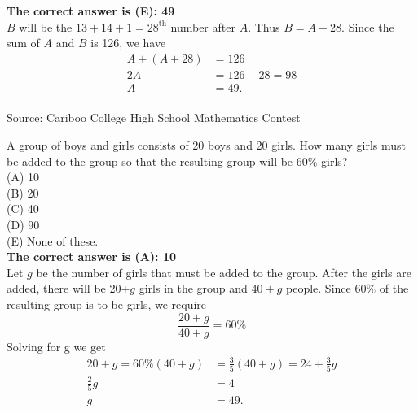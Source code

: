 \documentclass{article}
\begin{document}

\textbf{The correct answer is (E): 49}\\
$B$ will be the $13+14+1=28^{\textrm{th}}$ number after $A$. Thus $B=A+28$. Since the sum of $A$ and $B$ is 126, we have
\begin{align*}
A+(A+28)&=126\\
2A&=126-28=98\\
A&=49.
\end{align*}
\\[5 ex]

\scriptsize
Source: Cariboo College High School Mathematics Contest

\normalsize
A group of boys and girls consists of 20 boys and 20 girls. How many girls must be added to the group so that the resulting group will be $60\%$ girls?\\
(A) 10\\
(B) 20\\
(C) 40\\
(D) 90\\
(E) None of these.\\

\textbf{The correct answer is (A): 10}\\
Let $g$ be the number of girls that must be added to the group. After the girls are added, there will be 20+$g$ girls in the group and $40+g$ people. Since $60\%$ of the resulting group is to be girls, we require
\begin{equation*}
\frac{20+g}{40+g}=60\%
\end{equation*}
Solving for g we get
\begin{align*}
20+g=60\%(40+g)&=\frac{3}{5}(40+g)=24+\frac{3}{5}g\\
\frac{2}{5}g&=4\\
g&=49.
\end{align*}
\\[5 ex]
\end{document}
